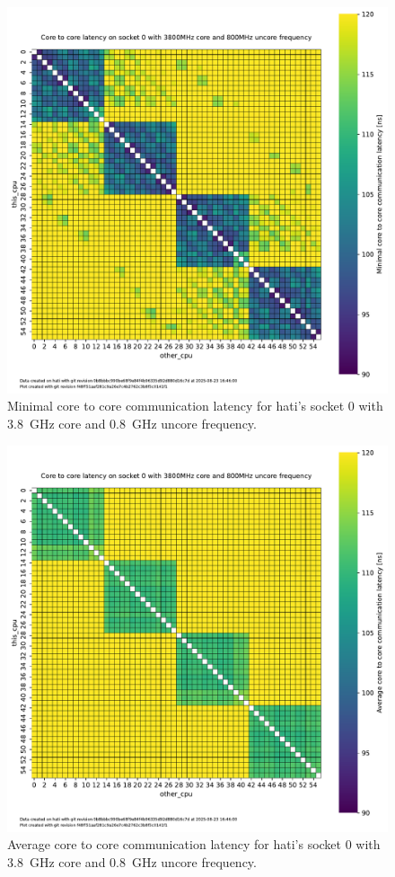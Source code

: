 \begin{figure}[]
    \centering
    \includegraphics[width=\columnwidth]{fig/core-to-core-latency/core-to-core-heatmap-min-3800-800.pdf}
    \caption{Minimal core to core communication latency for hati's socket 0 with \SI{3.8}{\GHz} core and \SI{0.8}{\GHz} uncore frequency.}
\end{figure}
\begin{figure}[]
    \centering
    \includegraphics[width=\columnwidth]{fig/core-to-core-latency/core-to-core-heatmap-avg-3800-800.pdf}
    \caption{Average core to core communication latency for hati's socket 0 with \SI{3.8}{\GHz} core and \SI{0.8}{\GHz} uncore frequency.}
\end{figure}
